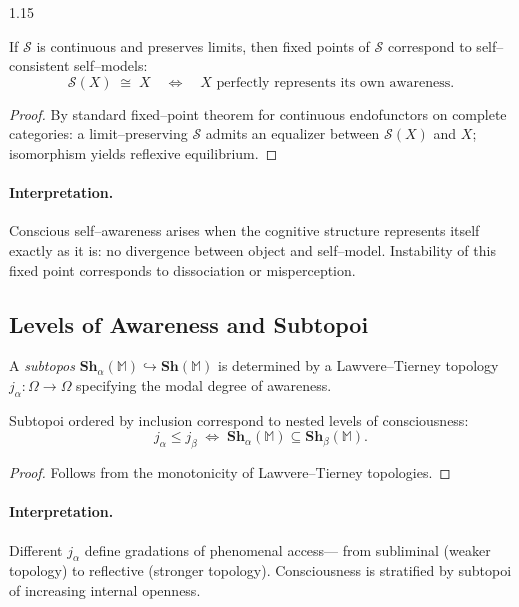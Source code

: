\documentclass[12pt,a4paper]{article}
\begin{document}
\begin{spacing}{1.15}
\begin{theorem}
\label{thm:reflective}
If \(\mathcal{S}\) is continuous and preserves limits,
then fixed points of \(\mathcal{S}\)
correspond to self–consistent self–models:
\[
  \mathcal{S}(X) \;\cong\; X
  \quad \Leftrightarrow \quad
  X \text{ perfectly represents its own awareness.}
\]
\end{theorem}

\begin{proof}
By standard fixed–point theorem for continuous endofunctors on complete categories:
a limit–preserving \(\mathcal{S}\) admits an equalizer between
\(\mathcal{S}(X)\) and \(X\);
isomorphism yields reflexive equilibrium.
\end{proof}

\paragraph{Interpretation.}
Conscious self–awareness arises
when the cognitive structure represents itself exactly as it is:
no divergence between object and self–model.
Instability of this fixed point corresponds to dissociation or misperception.

\subsection{Levels of Awareness and Subtopoi}

\begin{definition}
\label{def:subtopos}
A \emph{subtopos}
\(\mathbf{Sh}_{\alpha}(\mathbb{M}) \hookrightarrow \mathbf{Sh}(\mathbb{M})\)
is determined by a Lawvere–Tierney topology
\(j_{\alpha}:\Omega\to\Omega\)
specifying the modal degree of awareness.
\end{definition}

\begin{proposition}
\label{prop:hier}
Subtopoi ordered by inclusion correspond
to nested levels of consciousness:
\[
  j_{\alpha}\le j_{\beta}
  \;\Longleftrightarrow\;
  \mathbf{Sh}_{\alpha}(\mathbb{M})
  \subseteq
  \mathbf{Sh}_{\beta}(\mathbb{M}).
\]
\end{proposition}

\begin{proof}
Follows from the monotonicity of Lawvere–Tierney topologies.
\end{proof}

\paragraph{Interpretation.}
Different \(j_{\alpha}\) define gradations of phenomenal access—
from subliminal (weaker topology)
to reflective (stronger topology).
Consciousness is stratified by subtopoi of increasing internal openness.


\end{spacing}
\end{document}
